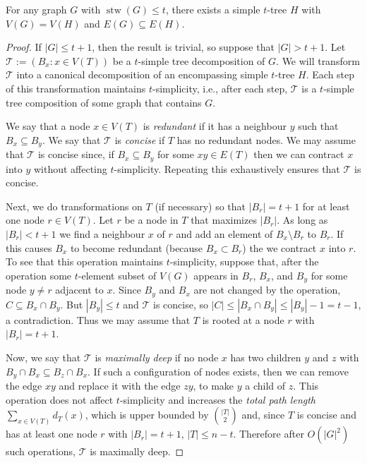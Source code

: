 \documentclass[kpfonts]{patmorin}
\DeclareMathOperator{\stw}{stw}
\theoremstyle{named}
\begin{document}
\begin{lem}\label{simple-subgraph}
    For any graph $G$ with $\stw(G)\le t$, there exists a simple $t$-tree $H$ with $V(G)= V(H)$ and $E(G)\subseteq E(H)$.
\end{lem}

\begin{proof}
    If $|G|\le t+1$, then the result is trivial, so suppose that $|G|>t+1$.
    Let $\mathcal{T}:=(B_x:x\in V(T))$ be a $t$-simple tree decomposition of $G$.  We will transform $\mathcal{T}$ into a canonical decomposition of an encompassing simple $t$-tree $H$.  Each step of this transformation maintains $t$-simplicity, i.e., after each step, $\mathcal{T}$ is a $t$-simple tree composition of some graph that contains $G$.

    We say that a node $x\in V(T)$ is \emph{redundant} if it has a neighbour $y$ such that $B_x\subseteq B_y$.  We say that $\mathcal{T}$ is \emph{concise} if $T$ has no redundant nodes.  We may assume that $\mathcal{T}$ is concise since,  if $B_x\subseteq B_y$ for some $xy\in E(T)$ then we can contract $x$ into $y$ without affecting $t$-simplicity.  Repeating this exhaustively ensures that $\mathcal{T}$ is concise.

    Next, we do transformations on $T$ (if necessary) so that $|B_r|=t+1$ for at least one node $r\in V(T)$. Let $r$ be a node in $T$ that maximizes $|B_r|$. As long as $|B_r|<t+1$ we find a neighbour $x$ of $r$ and add an element of $B_x\setminus B_r$ to $B_r$.  If this causes $B_x$ to become redundant (because $B_x\subset B_r$) the we contract $x$ into $r$.  To see that this operation maintains $t$-simplicity, suppose that, after the operation some $t$-element subset of $V(G)$ appears in $B_r$, $B_x$, and $B_y$ for some node $y\neq r$ adjacent to $x$.  Since $B_y$ and $B_x$ are not changed by the operation, $C\subseteq B_x\cap B_y$.  But $|B_y|\le t$ and $\mathcal{T}$ is concise, so $|C|\le|B_x\cap B_y|\le|B_y|-1= t-1$, a contradiction. Thus we may assume that $T$ is rooted at a node $r$ with $|B_r|=t+1$.

    Now, we say that $\mathcal{T}$ is \emph{maximally deep} if no node $x$ has two children $y$ and $z$ with $B_y\cap B_x\subseteq B_z\cap B_x$.  If such a configuration of nodes exists, then we can remove the edge $xy$ and replace it with the edge $zy$, to make $y$ a child of $z$.  This operation does not affect $t$-simplicity and increases the \emph{total path length} $\sum_{x\in V(T)} d_T(x)$, which is upper bounded by $\binom{|T|}{2}$ and, since $T$ is concise and has at least one node $r$ with $|B_r|=t+1$, $|T|\le n-t$.  Therefore after $O(|G|^2)$ such operations, $\mathcal{T}$ is maximally deep.


\end{proof}
\end{document}
